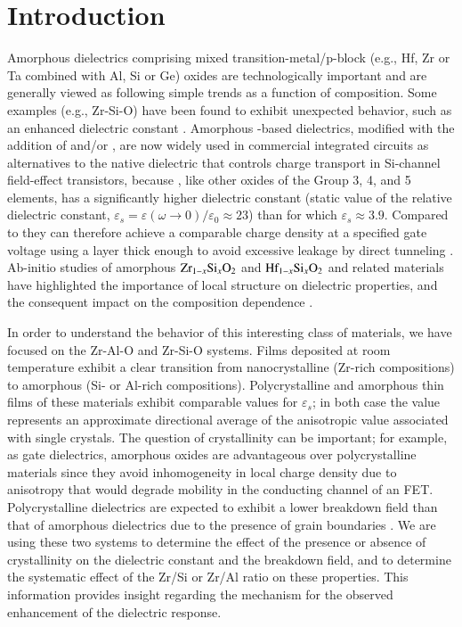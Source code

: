 \section{Introduction}
Amorphous  dielectrics comprising mixed transition-metal/p-block (e.g., Hf, Zr or Ta combined with Al, Si or Ge) oxides are technologically important and are generally viewed as following simple trends as a function of composition. Some examples (e.g., Zr-Si-O) have been found to exhibit unexpected behavior, such as an enhanced dielectric constant \cite{Wilk2000,Wilk2001,Lucovsky2000,Naoi2012}.
Amorphous -based dielectrics, modified with the addition of  and/or , are now widely used in commercial integrated circuits as alternatives to the native  dielectric that controls charge transport in Si-channel field-effect transistors, because , like other oxides of the Group 3, 4, and 5 elements, has a significantly higher dielectric constant (static value of the relative dielectric constant, $\varepsilon_s = \varepsilon (\omega \rightarrow 0)/\varepsilon_0 \approx 23$) than  for which $\varepsilon_s \approx 3.9$. 
Compared to  they can therefore achieve a comparable charge density at a specified gate voltage using a layer thick enough to avoid excessive leakage by direct tunneling \cite{Kingon2000}. Ab-initio studies of amorphous $\textnormal{Zr}_{1-x}\textnormal{Si}_{x}\textnormal{O}_{2}$ and $\textnormal{Hf}_{1-x}\textnormal{Si}_{x}\textnormal{O}_{2}$ and related materials have highlighted the importance of local structure on dielectric properties, and the consequent impact on the composition dependence \cite{Pignedoli2007,Nakamura2005,Rignanese2002,Ouyang2005}.

In order to understand the behavior of this interesting class of materials, we have focused on the Zr-Al-O and Zr-Si-O systems. Films deposited at room temperature exhibit a clear transition from nanocrystalline (Zr-rich compositions) to amorphous (Si- or Al-rich compositions). Polycrystalline and amorphous thin films of these materials exhibit comparable values for $\varepsilon_{s}$; in both case the value represents an approximate directional average of the anisotropic value associated with single crystals. The question of crystallinity can be important; for example, as gate dielectrics, amorphous oxides are advantageous over polycrystalline materials since they avoid inhomogeneity in local charge density due to anisotropy that would degrade mobility in the conducting channel of an FET. Polycrystalline dielectrics are expected to exhibit a lower breakdown field than that of amorphous dielectrics due to the presence of grain boundaries \cite{Lanza2012}. %
We are using these two systems to determine the effect of the presence or absence of crystallinity on the dielectric constant and the breakdown field, and to determine the systematic effect of the Zr/Si or Zr/Al ratio on these properties. This information provides insight regarding the mechanism for the observed enhancement of the dielectric response. 

